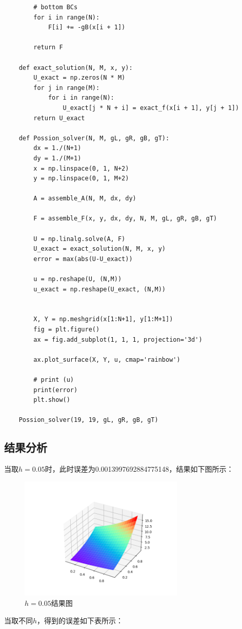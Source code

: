 \documentclass{ctexart}
\begin{document}
\begin{lstlisting}
        # bottom BCs
        for i in range(N):
            F[i] += -gB(x[i + 1])
        
        return F 
    
    def exact_solution(N, M, x, y):
        U_exact = np.zeros(N * M)
        for j in range(M):
            for i in range(N):
                U_exact[j * N + i] = exact_f(x[i + 1], y[j + 1])
        return U_exact
    
    def Possion_solver(N, M, gL, gR, gB, gT):
        dx = 1./(N+1)
        dy = 1./(M+1)
        x = np.linspace(0, 1, N+2)
        y = np.linspace(0, 1, M+2)
        
        A = assemble_A(N, M, dx, dy)
        
        F = assemble_F(x, y, dx, dy, N, M, gL, gR, gB, gT)
        
        U = np.linalg.solve(A, F)
        U_exact = exact_solution(N, M, x, y)
        error = max(abs(U-U_exact))
        
        u = np.reshape(U, (N,M))
        u_exact = np.reshape(U_exact, (N,M))
        
        
        X, Y = np.meshgrid(x[1:N+1], y[1:M+1])
        fig = plt.figure()
        ax = fig.add_subplot(1, 1, 1, projection='3d')
        
        ax.plot_surface(X, Y, u, cmap='rainbow')
        
        # print (u)
        print(error)
        plt.show()
        
    Possion_solver(19, 19, gL, gR, gB, gT)
\end{lstlisting}

\subsection{结果分析}
当取$h=0.05$时，此时误差为0.0013997692884775148，结果如下图所示：
\begin{figure}[H] %
    \centering %
    \includegraphics[width=0.7\textwidth]{result.png} %
    \caption{$h=0.05$结果图} %
    \label{Fig.main2} %
\end{figure}
当取不同$h$，得到的误差如下表所示：
\end{document}
